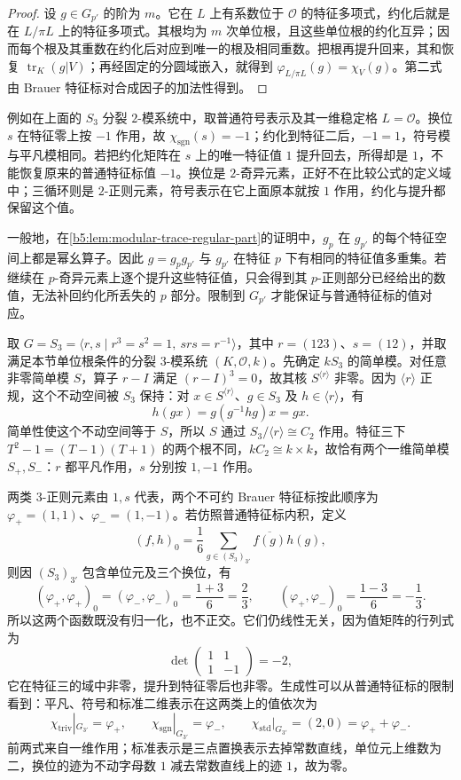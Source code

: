 \begin{proof}
	设 \(g\in G_{p'}\) 的阶为 \(m\)。它在 \(L\) 上有系数位于 \(\mathcal O\) 的特征多项式，约化后就是在 \(L/\pi L\) 上的特征多项式。其根均为 \(m\) 次单位根，且这些单位根的约化互异；因而每个根及其重数在约化后对应到唯一的根及相同重数。把根再提升回来，其和恢复 \(\operatorname{tr}_K(g|V)\)；再经固定的分圆域嵌入，就得到 \(\varphi_{L/\pi L}(g)=\chi_V(g)\)。第二式由 Brauer 特征标对合成因子的加法性得到。
\end{proof}
例如在上面的 \(S_3\) 分裂 \(2\)-模系统中，取普通符号表示及其一维稳定格 \(L=\mathcal O\)。换位 \(s\) 在特征零上按 \(-1\) 作用，故 \(\chi_{\mathrm{sgn}}(s)=-1\)；约化到特征二后，\(-1=1\)，符号模与平凡模相同。若把约化矩阵在 \(s\) 上的唯一特征值 \(1\) 提升回去，所得却是 \(1\)，不能恢复原来的普通特征标值 \(-1\)。换位是 \(2\)-奇异元素，正好不在比较公式的定义域中；三循环则是 \(2\)-正则元素，符号表示在它上面原本就按 \(1\) 作用，约化与提升都保留这个值。

\ProseParagraphBreak
一般地，在\cref{b5:lem:modular-trace-regular-part}的证明中，\(g_p\) 在 \(g_{p'}\) 的每个特征空间上都是幂幺算子。因此 \(g=g_pg_{p'}\) 与 \(g_{p'}\) 在特征 \(p\) 下有相同的特征值多重集。若继续在 \(p\)-奇异元素上逐个提升这些特征值，只会得到其 \(p\)-正则部分已经给出的数值，无法补回约化所丢失的 \(p\) 部分。限制到 \(G_{p'}\) 才能保证与普通特征标的值对应。

\begin{example}\label{b5:exm:brauer-s3-characteristic-three}
	取 \(G=S_3=\langle r,s\mid r^3=s^2=1,\ srs=r^{-1}\rangle\)，其中 \(r=(123)\)、\(s=(12)\)，并取满足本节单位根条件的分裂 \(3\)-模系统 \((K,\mathcal O,k)\)。先确定 \(kS_3\) 的简单模。对任意非零简单模 \(S\)，算子 \(r-I\) 满足 \((r-I)^3=0\)，故其核 \(S^{\langle r\rangle}\) 非零。因为 \(\langle r\rangle\) 正规，这个不动空间被 \(S_3\) 保持：对 \(x\in S^{\langle r\rangle}\)、\(g\in S_3\) 及 \(h\in\langle r\rangle\)，有
	\[
		h(gx)=g(g^{-1}hg)x=gx.
	\]
	简单性使这个不动空间等于 \(S\)，所以 \(S\) 通过 \(S_3/\langle r\rangle\cong C_2\) 作用。特征三下 \(T^2-1=(T-1)(T+1)\) 的两个根不同，\(kC_2\cong k\times k\)，故恰有两个一维简单模 \(S_+,S_-\)：\(r\) 都平凡作用，\(s\) 分别按 \(1,-1\) 作用。

	两类 \(3\)-正则元素由 \(1,s\) 代表，两个不可约 Brauer 特征标按此顺序为 \(\varphi_+=(1,1)\)、\(\varphi_-=(1,-1)\)。若仿照普通特征标内积，定义
	\[
		(f,h)_0=\frac1{6}\sum_{g\in(S_3)_{3'}}\overline{f(g)}h(g),
	\]
	则因 \((S_3)_{3'}\) 包含单位元及三个换位，有
	\[
		(\varphi_+,\varphi_+)_0=(\varphi_-,\varphi_-)_0=\frac{1+3}{6}=\frac23, \qquad (\varphi_+,\varphi_-)_0=\frac{1-3}{6}=-\frac13.
	\]
	所以这两个函数既没有归一化，也不正交。它们仍线性无关，因为值矩阵的行列式为
	\[
		\det\begin{pmatrix}1&1\\1&-1\end{pmatrix}=-2,
	\]
	它在特征三的域中非零，提升到特征零后也非零。生成性可以从普通特征标的限制看到：平凡、符号和标准二维表示在这两类上的值依次为
	\[
		\chi_{\mathrm{triv}}|_{G_{3'}}=\varphi_+,\qquad \chi_{\mathrm{sgn}}|_{G_{3'}}=\varphi_-,\qquad \chi_{\mathrm{std}}|_{G_{3'}}=(2,0)=\varphi_++\varphi_-.
	\]
	前两式来自一维作用；标准表示是三点置换表示去掉常数直线，单位元上维数为二，换位的迹为不动字母数 \(1\) 减去常数直线上的迹 \(1\)，故为零。
\end{example}

